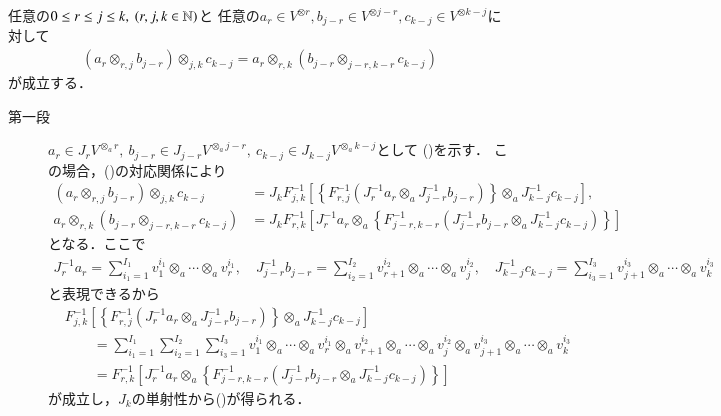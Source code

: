 	\begin{screen}
		\begin{lem}\label{lem:associative_law}
			任意の$0 \leq r \leq j \leq k,\ (r,j,k \in \mathbb{N})$と
			任意の$a_r \in V^{\otimes r}, b_{j-r} \in V^{\otimes j-r},
			c_{k-j} \in V^{\otimes k-j}$に対して
			\begin{align}
				\left( a_r \otimes_{r,j} b_{j-r} \right) \otimes_{j,k} c_{k-j}
				= a_r \otimes_{r,k} \left( b_{j-r} \otimes_{j-r,k-r} c_{k-j} \right)
				\label{eq:thm_otimes_is_a_multiplication_1}
			\end{align}
			が成立する．
		\end{lem}
	\end{screen}
	
	\begin{prf}\mbox{}
		\begin{description}
			\item[第一段]
				$a_r \in J_r V^{\otimes_a r},\ b_{j-r} \in J_{j-r} V^{\otimes_a j-r},
				\ c_{k-j} \in J_{k-j} V^{\otimes_a k-j}$として
				()を示す．
				この場合，()の対応関係により
				\begin{align}
					\left( a_r \otimes_{r,j} b_{j-r} \right) \otimes_{j,k} c_{k-j}
					&= J_k F_{j,k}^{-1}\left[ \left\{ F_{r,j}^{-1} \left( J_r^{-1}a_r \otimes_a J_{j-r}^{-1} b_{j-r} \right) \right\} \otimes_a J_{k-j}^{-1} c_{k-j} \right], \\
					a_r \otimes_{r,k} \left( b_{j-r} \otimes_{j-r,k-r} c_{k-j} \right)
					&= J_k F_{r,k}^{-1}\left[ J_r^{-1}a_r \otimes_a \left\{ F_{j-r,k-r}^{-1} \left( J_{j-r}^{-1} b_{j-r} \otimes_a J_{k-j}^{-1} c_{k-j} \right) \right\} \right]
				\end{align}
				となる．ここで
				\begin{align}
					J_r^{-1} a_r = \sum_{i_1 = 1}^{I_1} v_1^{i_1} \otimes_a \cdots \otimes_a v_r^{i_1},
					\quad J_{j-r}^{-1} b_{j-r} = \sum_{i_2 = 1}^{I_2} v_{r+1}^{i_2} \otimes_a \cdots \otimes_a v_j^{i_2},
					\quad J_{k-j}^{-1} c_{k-j} = \sum_{i_3 = 1}^{I_3} v_{j+1}^{i_3} \otimes_a \cdots \otimes_a v_k^{i_3}
				\end{align}
				と表現できるから
				\begin{align}
					&F_{j,k}^{-1}\left[ \left\{ F_{r,j}^{-1} \left( J_r^{-1}a_r \otimes_a J_{j-r}^{-1} b_{j-r} \right) \right\} \otimes_a J_{k-j}^{-1} c_{k-j} \right] \\
					&\qquad = \sum_{i_1=1}^{I_1}\sum_{i_2=1}^{I_2}\sum_{i_3=1}^{I_3} 
						v_1^{i_1} \otimes_a \cdots \otimes_a v_r^{i_1}
						\otimes_a v_{r+1}^{i_2} \otimes_a \cdots \otimes_a v_j^{i_2}
						\otimes_a v_{j+1}^{i_3} \otimes_a \cdots \otimes_a v_k^{i_3} \\
					&\qquad = 	F_{r,k}^{-1}\left[ J_r^{-1}a_r \otimes_a \left\{ F_{j-r,k-r}^{-1} \left( J_{j-r}^{-1} b_{j-r} \otimes_a J_{k-j}^{-1} c_{k-j} \right) \right\} \right]
				\end{align}
				が成立し，$J_k$の単射性から()が得られる．
			

\end{description}
\end{prf}
